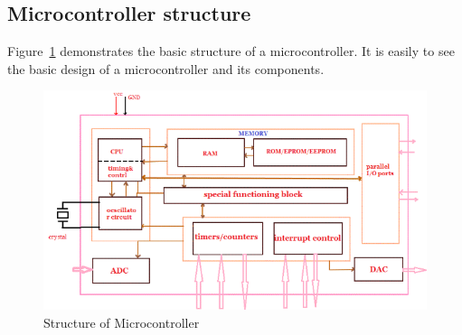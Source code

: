  \subsection{Microcontroller structure}
  Figure~\ref{fig:mcuStructure} demonstrates the basic structure of a microcontroller. It is easily to see the basic design of a microcontroller and its components.
  \begin{figure}[!ht]
    \includegraphics[scale=0.9]{images/Microcontroller-Structure.png}
    \caption{Structure of Microcontroller}
    \label{fig:mcuStructure}
  \end{figure}
  
